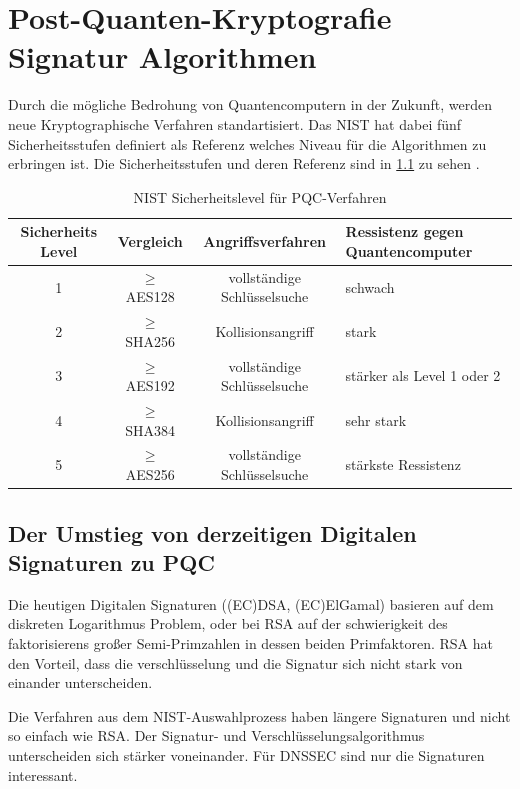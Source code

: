\chapter{Post-Quanten-Kryptografie Signatur Algorithmen}
\label{section-Post-Quanten-Kryptografie-algorithmen}
Durch die mögliche Bedrohung von Quantencomputern in der Zukunft, werden neue Kryptographische Verfahren standartisiert.
Das NIST hat dabei fünf Sicherheitsstufen definiert als Referenz welches Niveau für die Algorithmen zu erbringen ist.
Die Sicherheitsstufen und deren Referenz sind in \ref{fig:NIST-Sicherheitslevel} zu sehen \cite{soniHardwareArchitecturesPostQuantum2021}.

\begin{table}[htbp]
    \centering
    \begin{tabular}{|c|c|c|>{\centering\arraybackslash}p{3.5cm}|}
        \hline
        Sicherheits Level & Vergleich & Angriffsverfahren & Ressistenz gegen Quantencomputer\\
        \hline
        1 & $\ge$ AES128 & vollständige Schlüsselsuche & schwach\\
        \hline
        2 & $\ge$ SHA256 & Kollisionsangriff & stark\\
        \hline
        3 & $\ge$ AES192 & vollständige Schlüsselsuche & stärker als Level 1 oder 2\\
        \hline
        4 & $\ge$ SHA384 & Kollisionsangriff & sehr stark\\
        \hline
        5 & $\ge$ AES256 & vollständige Schlüsselsuche & stärkste Ressistenz\\
        \hline
    \end{tabular}
    \caption{NIST Sicherheitslevel für PQC-Verfahren}
    \label{fig:NIST-Sicherheitslevel}
\end{table}

\section{Der Umstieg von derzeitigen Digitalen Signaturen zu PQC}
Die heutigen Digitalen Signaturen ((EC)DSA, (EC)ElGamal) basieren auf dem diskreten Logarithmus Problem, oder bei RSA auf der schwierigkeit des faktorisierens großer Semi-Primzahlen in dessen beiden Primfaktoren.
RSA hat den Vorteil, dass die verschlüsselung und die Signatur sich nicht stark von einander unterscheiden.\cite{paarKryptografieVerstaendlichLehrbuch2016}

Die Verfahren aus dem NIST-Auswahlprozess haben längere Signaturen und nicht so einfach wie RSA.
Der Signatur- und Verschlüsselungsalgorithmus unterscheiden sich stärker voneinander. Für DNSSEC sind nur die Signaturen interessant.

